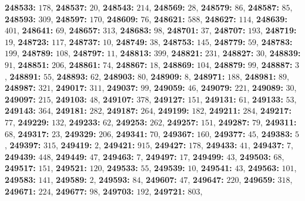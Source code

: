 \textsf{\bfseries 248533:} $178$, \textsf{\bfseries 248537:} $20$, \textsf{\bfseries 248543:} $214$, \textsf{\bfseries 248569:} $28$, \textsf{\bfseries 248579:} $86$, \textsf{\bfseries 248587:} $85$, \textsf{\bfseries 248593:} $309$, \textsf{\bfseries 248597:} $170$, \textsf{\bfseries 248609:} $76$, \textsf{\bfseries 248621:} $588$, \textsf{\bfseries 248627:} $114$, \textsf{\bfseries 248639:} $401$, \textsf{\bfseries 248641:} $69$, \textsf{\bfseries 248657:} $313$, \textsf{\bfseries 248683:} $98$, \textsf{\bfseries 248701:} $37$, \textsf{\bfseries 248707:} $193$, \textsf{\bfseries 248719:} $19$, \textsf{\bfseries 248723:} $117$, \textsf{\bfseries 248737:} $10$, \textsf{\bfseries 248749:} $38$, \textsf{\bfseries 248753:} $145$, \textsf{\bfseries 248779:} $59$, \textsf{\bfseries 248783:} $199$, \textsf{\bfseries 248789:} $108$, \textsf{\bfseries 248797:} $11$, \textsf{\bfseries 248813:} $399$, \textsf{\bfseries 248821:} $231$, \textsf{\bfseries 248827:} $30$, \textsf{\bfseries 248839:} $91$, \textsf{\bfseries 248851:} $206$, \textsf{\bfseries 248861:} $74$, \textsf{\bfseries 248867:} $18$, \textsf{\bfseries 248869:} $104$, \textsf{\bfseries 248879:} $99$, \textsf{\bfseries 248887:} $3$, \textsf{\bfseries 248891:} $55$, \textsf{\bfseries 248893:} $62$, \textsf{\bfseries 248903:} $80$, \textsf{\bfseries 248909:} $8$, \textsf{\bfseries 248971:} $188$, \textsf{\bfseries 248981:} $89$, \textsf{\bfseries 248987:} $321$, \textsf{\bfseries 249017:} $311$, \textsf{\bfseries 249037:} $99$, \textsf{\bfseries 249059:} $46$, \textsf{\bfseries 249079:} $221$, \textsf{\bfseries 249089:} $30$, \textsf{\bfseries 249097:} $215$, \textsf{\bfseries 249103:} $48$, \textsf{\bfseries 249107:} $378$, \textsf{\bfseries 249127:} $151$, \textsf{\bfseries 249131:} $61$, \textsf{\bfseries 249133:} $53$, \textsf{\bfseries 249143:} $364$, \textsf{\bfseries 249181:} $282$, \textsf{\bfseries 249187:} $264$, \textsf{\bfseries 249199:} $182$, \textsf{\bfseries 249211:} $284$, \textsf{\bfseries 249217:} $77$, \textsf{\bfseries 249229:} $132$, \textsf{\bfseries 249233:} $62$, \textsf{\bfseries 249253:} $262$, \textsf{\bfseries 249257:} $151$, \textsf{\bfseries 249287:} $79$, \textsf{\bfseries 249311:} $68$, \textsf{\bfseries 249317:} $23$, \textsf{\bfseries 249329:} $206$, \textsf{\bfseries 249341:} $70$, \textsf{\bfseries 249367:} $160$, \textsf{\bfseries 249377:} $45$, \textsf{\bfseries 249383:} $5$, \textsf{\bfseries 249397:} $315$, \textsf{\bfseries 249419:} $2$, \textsf{\bfseries 249421:} $915$, \textsf{\bfseries 249427:} $178$, \textsf{\bfseries 249433:} $41$, \textsf{\bfseries 249437:} $7$, \textsf{\bfseries 249439:} $448$, \textsf{\bfseries 249449:} $47$, \textsf{\bfseries 249463:} $7$, \textsf{\bfseries 249497:} $17$, \textsf{\bfseries 249499:} $43$, \textsf{\bfseries 249503:} $68$, \textsf{\bfseries 249517:} $151$, \textsf{\bfseries 249521:} $120$, \textsf{\bfseries 249533:} $55$, \textsf{\bfseries 249539:} $10$, \textsf{\bfseries 249541:} $43$, \textsf{\bfseries 249563:} $101$, \textsf{\bfseries 249583:} $141$, \textsf{\bfseries 249589:} $2$, \textsf{\bfseries 249593:} $84$, \textsf{\bfseries 249607:} $47$, \textsf{\bfseries 249647:} $220$, \textsf{\bfseries 249659:} $318$, \textsf{\bfseries 249671:} $224$, \textsf{\bfseries 249677:} $98$, \textsf{\bfseries 249703:} $192$, \textsf{\bfseries 249721:} $803$, 

